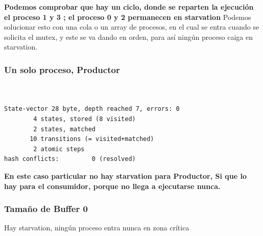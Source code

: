 \documentclass[a4paper,12pt]{article}
\begin{document}
\textbf{Podemos comprobar que hay un ciclo, donde se reparten la ejecución el proceso 1 y 3 ; el proceso 0 y 2 permanecen en starvation}
Podemos solucionar esto con una cola o un array de procesos, en el cual se entra cuando se solicita el mutex, y este se va dando en orden, para así ningún proceso caiga en starvation.

\newpage
\subsubsection{Un solo proceso, Productor}
\begin{lstlisting}[frame=single]  % Start your code-block


State-vector 28 byte, depth reached 7, errors: 0
        4 states, stored (8 visited)
        2 states, matched
       10 transitions (= visited+matched)
        2 atomic steps
hash conflicts:         0 (resolved)
\end{lstlisting}

\textbf{En este caso particular no hay starvation para Productor, Si que lo hay para el consumidor, porque no llega a ejecutarse nunca.}

\subsubsection{Tamaño de Buffer 0}
Hay starvation, ningún proceso entra nunca en zona crítica
\end{document}
